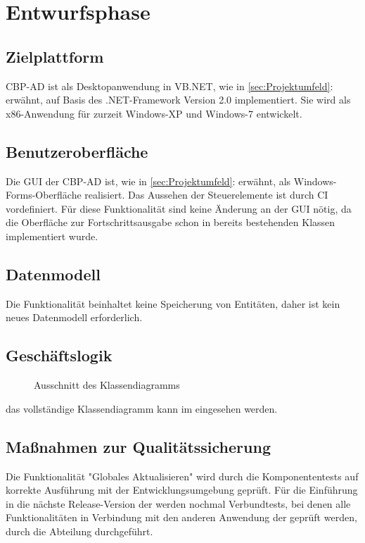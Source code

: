 
\section{Entwurfsphase} 
\label{sec:Entwurfsphase}

\subsection{Zielplattform}
\label{sec:Zielplattform}

\ac{CBP-AD} ist als Desktopanwendung in \acs{VB}.NET, wie in \ref{sec:Projektumfeld}:  erwähnt, auf Basis des .NET-Framework Version 2.0 implementiert.
Sie wird als x86-Anwendung für zurzeit Windows-XP und Windows-7 entwickelt.


\subsection{Benutzeroberfläche}
\label{sec:Benutzeroberflaeche}

Die \acs{GUI} der \ac{CBP-AD} ist, wie in \ref{sec:Projektumfeld}:  erwähnt, als Windows-Forms-Oberfläche realisiert. Das Aussehen der Steuerelemente ist durch \ac{CI} vordefiniert.
Für diese Funktionalität sind keine Änderung an der \acs{GUI} nötig, da die Oberfläche zur Fortschrittsausgabe schon in bereits bestehenden Klassen implementiert wurde.


\subsection{Datenmodell}
\label{sec:Datenmodell}

Die Funktionalität \gqq{\titel} beinhaltet keine Speicherung von Entitäten, daher ist kein neues Datenmodell erforderlich.


\subsection{Geschäftslogik}
\label{sec:Geschaeftslogik}

\begin{figure}[htb]
	\centering
	\caption{Ausschnitt des Klassendiagramms}
\end{figure}

das vollständige Klassendiagramm kann im  eingesehen werden.


\subsection{Maßnahmen zur Qualitätssicherung}
\label{sec:Qualitaetssicherung}

Die Funktionalität "Globales Aktualisieren" wird durch die Komponententests auf korrekte Ausführung mit der Entwicklungsumgebung geprüft. Für die Einführung in die nächste Release-Version der \CBPAD werden nochmal Verbundtests, bei denen alle Funktionalitäten in Verbindung mit den anderen Anwendung der \CBP geprüft werden, durch die Abteilung durchgeführt.


